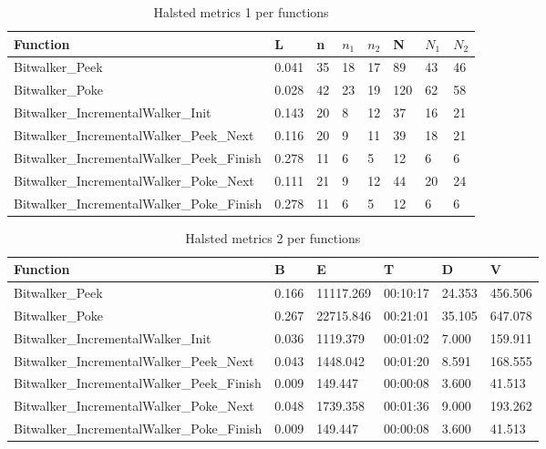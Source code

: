\begin{description}
\begin{longtable}{||p{}|p{}|p{}|p{}|p{}|p{}|p{}|p{}||}
  \caption{Halsted metrics 1 per functions}\\
    \hline\hline
    \textbf{Function} &\textbf{L} & \textbf{n} & \textbf{$n_1$} & \textbf{$n_2$} & \textbf{N} & \textbf{$N_1$} & \textbf{$N_2$}\\
    \hline\hline
    \endhead
    \hline\hline
    \endfoot
    Bitwalker\_Peek & 0.041 & 35 & 18 & 17 & 89 & 43 & 46
    \\
    \hline
    Bitwalker\_Poke & 0.028 & 42 & 23 & 19 & 120 & 62 & 58
    \\
    \hline
    Bitwalker\_IncrementalWalker\_Init & 0.143 & 20 & 8 & 12 & 37 & 16 & 21
    \\
    \hline
    Bitwalker\_IncrementalWalker\_Peek\_Next & 0.116 & 20 & 9 & 11 & 39 & 18 & 21
    \\
    \hline
    Bitwalker\_IncrementalWalker\_Peek\_Finish & 0.278 & 11 & 6 & 5 & 12 & 6 & 6
    \\
    \hline
    Bitwalker\_IncrementalWalker\_Poke\_Next & 0.111 & 21 & 9 & 12 & 44 & 20 & 24
    \\
    \hline
    Bitwalker\_IncrementalWalker\_Poke\_Finish & 0.278 & 11 & 6 & 5 & 12 & 6 & 6
    \\
    \hline
   \end{longtable}
   
\begin{longtable}{||p{}|p{}|p{}|p{}|p{}|p{}||}
  \caption{Halsted metrics 2 per functions}\\
    \hline\hline
    \textbf{Function} &\textbf{B} & \textbf{E} & \textbf{T} & \textbf{D} & \textbf{V}\\
    \hline\hline
    \endhead
    \hline\hline
    \endfoot
    Bitwalker\_Peek & 0.166 & 11117.269 & 00:10:17 & 24.353 & 456.506 
    \\
    \hline
    Bitwalker\_Poke & 0.267 & 22715.846 & 00:21:01 & 35.105 & 647.078 
    \\
    \hline
    Bitwalker\_IncrementalWalker\_Init & 0.036 & 1119.379 & 00:01:02 & 7.000 & 159.911 
    \\
    \hline
    Bitwalker\_IncrementalWalker\_Peek\_Next & 0.043 & 1448.042 & 00:01:20 & 8.591 & 168.555 
    \\
    \hline
    Bitwalker\_IncrementalWalker\_Peek\_Finish & 0.009 & 149.447 & 00:00:08 & 3.600 & 41.513 
    \\
    \hline
    Bitwalker\_IncrementalWalker\_Poke\_Next & 0.048 & 1739.358 & 00:01:36 & 9.000 & 193.262 
    \\
    \hline
    Bitwalker\_IncrementalWalker\_Poke\_Finish & 0.009 & 149.447 & 00:00:08 & 3.600 & 41.513 
    \\
    \hline
   \end{longtable}

\end{description}


